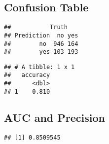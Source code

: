 \documentclass[]{article}
\newenvironment{Shaded}{\begin{snugshade}}{\end{snugshade}}
\newcommand{\KeywordTok}[1]{\textcolor[rgb]{0.13,0.29,0.53}{\textbf{#1}}}
\newcommand{\DataTypeTok}[1]{\textcolor[rgb]{0.13,0.29,0.53}{#1}}
\newcommand{\StringTok}[1]{\textcolor[rgb]{0.31,0.60,0.02}{#1}}
\newcommand{\CommentTok}[1]{\textcolor[rgb]{0.56,0.35,0.01}{\textit{#1}}}
\newcommand{\OperatorTok}[1]{\textcolor[rgb]{0.81,0.36,0.00}{\textbf{#1}}}
\newcommand{\NormalTok}[1]{#1}
\begin{document}
\subsection{Confusion Table}\label{confusion-table}

\begin{Shaded}
\end{Shaded}

\begin{verbatim}
##           Truth
## Prediction  no yes
##        no  946 164
##        yes 103 193
\end{verbatim}

\begin{Shaded}
\end{Shaded}

\begin{verbatim}
## # A tibble: 1 x 1
##   accuracy
##      <dbl>
## 1    0.810
\end{verbatim}

\subsection{AUC and Precision}\label{auc-and-precision}

\begin{Shaded}
\end{Shaded}

\begin{verbatim}
## [1] 0.8509545
\end{verbatim}

\begin{Shaded}
\end{Shaded}
\end{document}
